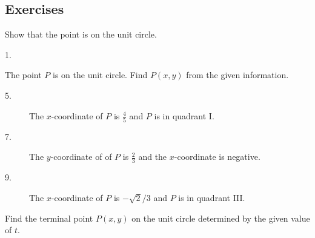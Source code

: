 \subsection{Exercises}
Show that the point is on the unit circle. 


\begin{description}
	\item [1.]   
	\columnsep =30pt
	\begin {multicols}{2}
	$\left (\frac{3}{5} ,\frac{4}{5}\right )$ 
	
	\item [3.]
	$\left ( -\frac{2}{3} , -\frac{\sqrt{5}}{3}\right )$ 
	\end {multicols}
\end{description}

The point $P$ is on the unit circle. Find $P (x ,y)$ from the given information. 


\begin{description}
	\item [5.] The $x$-coordinate of $P$ is $\frac{4}{5}$ and $P$ is in quadrant I. 
	
	\item [7.] The
	$y$-coordinate of of $P$ is $\frac{2}{3}$ and the $x$-coordinate is negative. 
	
	\item [9.]
	The $x$-coordinate of $P$ is $ -\sqrt{2}/3$ and $P$ is in quadrant III. \end{description}

Find the terminal point $P (x ,y)$ on the unit circle determined by the given value of $t$. 


